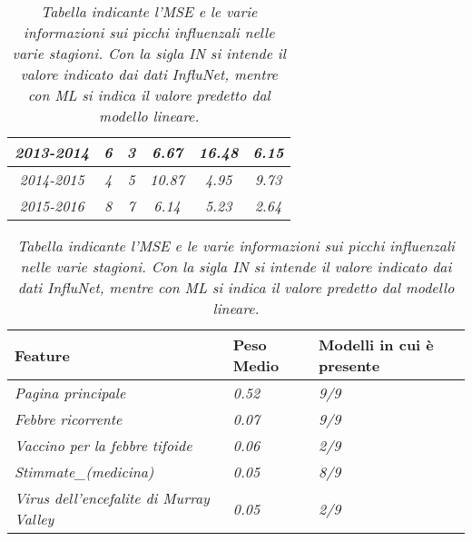 \begin{table}[p]
\begin{adjustbox}{max width=\textwidth}
\begin{tabular}{|c|c|c|c|c|c|}
\rowcolor[HTML]{FFFFFF} 
\textit{2013-2014}            & \textit{6}                          & \textit{3}                    & \textit{6.67}           & \textit{16.48}    & \textit{6.15}     \\ \hline
\rowcolor[HTML]{FFFFFF} 
\textit{2014-2015}            & \textit{4}                          & \textit{5}                    & \textit{10.87}          & \textit{4.95}     & \textit{9.73}     \\ \hline
\rowcolor[HTML]{FFFFFF} 
\textit{2015-2016}            & \textit{8}                          & \textit{7}                    & \textit{6.14}           & \textit{5.23}     & \textit{2.64}     \\ \hline
\end{tabular}
\end{adjustbox}
\caption{\textit{Tabella indicante l'MSE e le varie informazioni sui picchi influenzali nelle varie stagioni. Con la sigla IN si intende il valore indicato dai dati InfluNet, mentre con ML si indica il valore predetto dal modello lineare.}}
\label{tab:ch_3_poisson_model}
\end{table}

\begin{table}[p]
\centering 
\begin{adjustbox}{max width=\textwidth}
\begin{tabular}{|l|l|l|}
\hline
\rowcolor[HTML]{C0C0C0} 
{\color[HTML]{000000} \textbf{Feature}}         & {\color[HTML]{000000} \textbf{Peso Medio}} & {\color[HTML]{000000} \textbf{Modelli in cui è presente}} \\ \hline
\textit{Pagina principale}                      & \textit{0.52}                              & \textit{9/9}                                              \\ \hline
\textit{Febbre ricorrente}                      & \textit{0.07}                              & \textit{9/9}                                              \\ \hline
\textit{Vaccino per la febbre tifoide}          & \textit{0.06}                              & \textit{2/9}                                              \\ \hline
\textit{Stimmate\_(medicina)}                   & \textit{0.05}                              & \textit{8/9}                                              \\ \hline
\textit{Virus dell'encefalite di Murray Valley} & \textit{0.05}                              & \textit{2/9}                                              \\ \hline
\end{tabular}
\end{adjustbox}
\caption{\textit{Tabella indicante l'MSE e le varie informazioni sui picchi influenzali nelle varie stagioni. Con la sigla IN si intende il valore indicato dai dati InfluNet, mentre con ML si indica il valore predetto dal modello lineare.}}
\label{tab:ch_3_poisson_model_feature}
\end{table}

